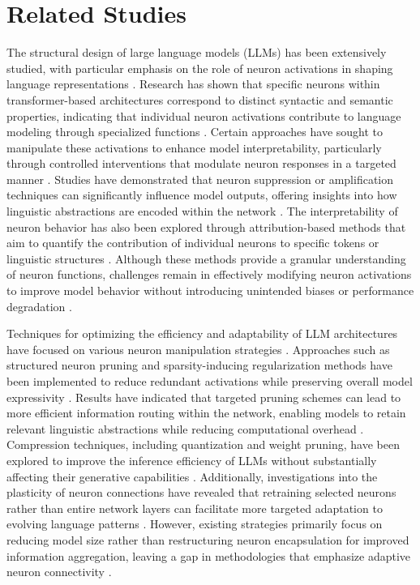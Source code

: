 \section{Related Studies}
The structural design of large language models (LLMs) has been extensively studied, with particular emphasis on the role of neuron activations in shaping language representations \cite{choquet2024exploiting}. Research has shown that specific neurons within transformer-based architectures correspond to distinct syntactic and semantic properties, indicating that individual neuron activations contribute to language modeling through specialized functions \cite{golatkar2024cpr}. Certain approaches have sought to manipulate these activations to enhance model interpretability, particularly through controlled interventions that modulate neuron responses in a targeted manner \cite{sang2024evaluating}. Studies have demonstrated that neuron suppression or amplification techniques can significantly influence model outputs, offering insights into how linguistic abstractions are encoded within the network \cite{higasigi2024novel}. The interpretability of neuron behavior has also been explored through attribution-based methods that aim to quantify the contribution of individual neurons to specific tokens or linguistic structures \cite{nabovina2024neural, soikao2024novel}. Although these methods provide a granular understanding of neuron functions, challenges remain in effectively modifying neuron activations to improve model behavior without introducing unintended biases or performance degradation \cite{ pagacheva2024dynamic}. 

Techniques for optimizing the efficiency and adaptability of LLM architectures have focused on various neuron manipulation strategies \cite{nademort2024innovative}. Approaches such as structured neuron pruning and sparsity-inducing regularization methods have been implemented to reduce redundant activations while preserving overall model expressivity \cite{bernar2024exploring}. Results have indicated that targeted pruning schemes can lead to more efficient information routing within the network, enabling models to retain relevant linguistic abstractions while reducing computational overhead \cite{geline2024linguistic}. Compression techniques, including quantization and weight pruning, have been explored to improve the inference efficiency of LLMs without substantially affecting their generative capabilities \cite{shan2024benchmarking}. Additionally, investigations into the plasticity of neuron connections have revealed that retraining selected neurons rather than entire network layers can facilitate more targeted adaptation to evolving language patterns \cite{ sefeni2024game}. However, existing strategies primarily focus on reducing model size rather than restructuring neuron encapsulation for improved information aggregation, leaving a gap in methodologies that emphasize adaptive neuron connectivity \cite{korbanov2024hierarchical}. 

